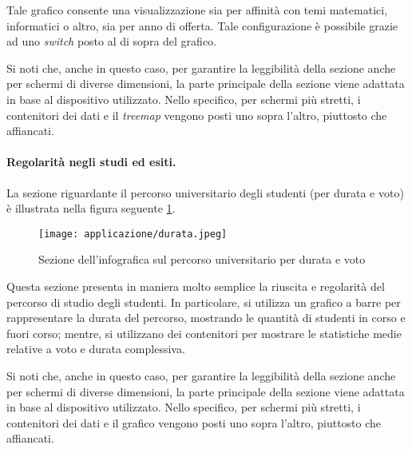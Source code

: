 Tale grafico consente una visualizzazione sia per affinità con temi matematici, informatici o altro, sia per anno di offerta.
Tale configurazione è possibile grazie ad uno \emph{switch} posto al di sopra del grafico.

\bigskip
\noindent Si noti che, anche in questo caso, per garantire la leggibilità della sezione anche per schermi di diverse dimensioni, la parte principale della sezione viene adattata 
in base al dispositivo utilizzato. Nello specifico, per schermi più stretti, i contenitori dei dati e il \emph{treemap} vengono posti uno sopra l'altro, piuttosto che affiancati.

\paragraph{Regolarità negli studi ed esiti.} La sezione riguardante il percorso universitario degli studenti (per durata e voto) è illustrata nella figura seguente \ref{fig:app_durata}. 
\begin{figure}[H] 
    \centering 
    \texttt{[image: applicazione/durata.jpeg]} 
    \caption{Sezione dell'infografica sul percorso universitario per durata e voto}
    \label{fig:app_durata}
\end{figure}
\noindent Questa sezione presenta in maniera molto semplice la riuscita e regolarità del percorso di studio degli studenti. In particolare, si utilizza un grafico a barre 
per rappresentare la durata del percorso, mostrando le quantità di studenti in corso e fuori corso; mentre, si utilizzano dei contenitori per mostrare le statistiche medie relative 
a voto e durata complessiva.

\bigskip
\noindent Si noti che, anche in questo caso, per garantire la leggibilità della sezione anche per schermi di diverse dimensioni, la parte principale della sezione viene adattata 
in base al dispositivo utilizzato. Nello specifico, per schermi più stretti, i contenitori dei dati e il grafico vengono posti uno sopra l'altro, piuttosto che affiancati.

